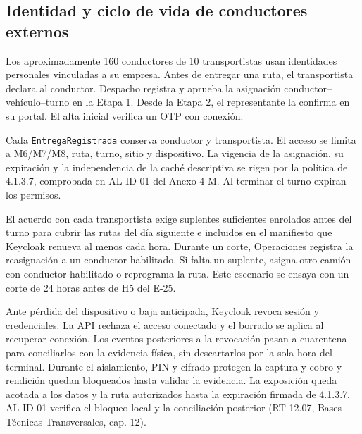 \subsection{Identidad y ciclo de vida de conductores externos}
\label{sec:conductores-externos}

Los aproximadamente 160 conductores de 10 transportistas usan identidades personales vinculadas a su empresa. Antes de entregar una ruta, el transportista declara al conductor. Despacho registra y aprueba la asignación conductor--vehículo--turno en la Etapa 1. Desde la Etapa 2, el representante la confirma en su portal. El alta inicial verifica un OTP con conexión.

Cada \texttt{EntregaRegistrada} conserva conductor y transportista. El acceso se limita a M6/M7/M8, ruta, turno, sitio y dispositivo. La vigencia de la asignación, su expiración y la independencia de la caché descriptiva se rigen por la política de 4.1.3.7, comprobada en AL-ID-01 del Anexo 4-M. Al terminar el turno expiran los permisos.

El acuerdo con cada transportista exige suplentes suficientes enrolados antes del turno para cubrir las rutas del día siguiente e incluidos en el manifiesto que Keycloak renueva al menos cada hora. Durante un corte, Operaciones registra la reasignación a un conductor habilitado. Si falta un suplente, asigna otro camión con conductor habilitado o reprograma la ruta. Este escenario se ensaya con un corte de 24 horas antes de H5 del E-25.

Ante pérdida del dispositivo o baja anticipada, Keycloak revoca sesión y credenciales. La API rechaza el acceso conectado y el borrado se aplica al recuperar conexión. Los eventos posteriores a la revocación pasan a cuarentena para conciliarlos con la evidencia física, sin descartarlos por la sola hora del terminal. Durante el aislamiento, PIN y cifrado protegen la captura y cobro y rendición quedan bloqueados hasta validar la evidencia. La exposición queda acotada a los datos y la ruta autorizados hasta la expiración firmada de 4.1.3.7. AL-ID-01 verifica el bloqueo local y la conciliación posterior (RT-12.07, Bases Técnicas Transversales, cap. 12).
